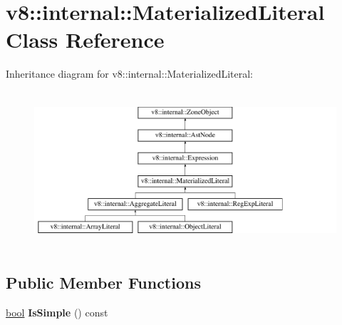 \hypertarget{classv8_1_1internal_1_1MaterializedLiteral}{}\section{v8\+:\+:internal\+:\+:Materialized\+Literal Class Reference}
\label{classv8_1_1internal_1_1MaterializedLiteral}
Inheritance diagram for v8\+:\+:internal\+:\+:Materialized\+Literal\+:\begin{figure}[H]
\begin{center}
\leavevmode
\includegraphics[height=5.833333cm]{classv8_1_1internal_1_1MaterializedLiteral}
\end{center}
\end{figure}
\subsection*{Public Member Functions}
\begin{DoxyCompactItemize}
\item 
\mbox{\label{classv8_1_1internal_1_1MaterializedLiteral_aa63ccdb0c1ce7bb9f0ac5a42dc914ad6}} 
\mbox{\hyperlink{classbool}{bool}} {\bfseries Is\+Simple} () const
\end{DoxyCompactItemize}
